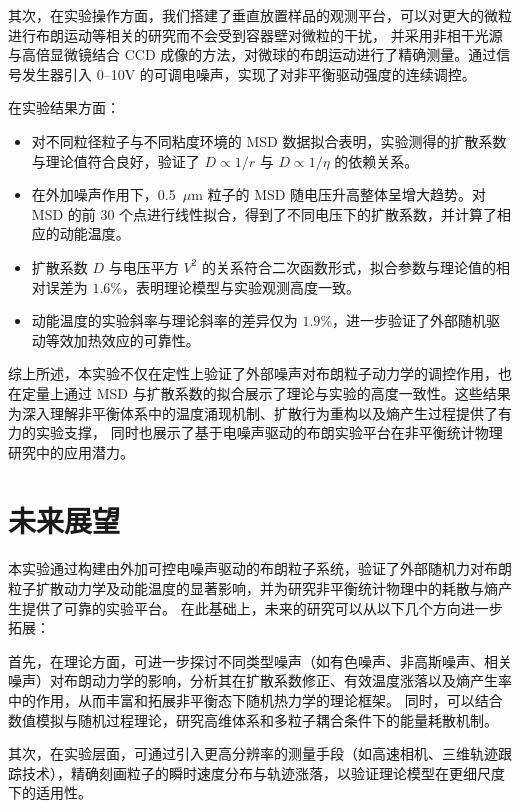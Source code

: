 \documentclass[a4paper]{report} %
\begin{document}
其次，在实验操作方面，我们搭建了垂直放置样品的观测平台，可以对更大的微粒进行布朗运动等相关的研究而不会受到容器壁对微粒的干扰，
并采用非相干光源与高倍显微镜结合 CCD 成像的方法，对微球的布朗运动进行了精确测量。通过信号发生器引入 0--10V 的可调电噪声，实现了对非平衡驱动强度的连续调控。\par

在实验结果方面：\par
\begin{itemize}
    \item 对不同粒径粒子与不同粘度环境的 MSD 数据拟合表明，实验测得的扩散系数与理论值符合良好，验证了 $D \propto 1/r$ 与 $D \propto 1/\eta$ 的依赖关系。
    \item 在外加噪声作用下，0.5~$\mu$m 粒子的 MSD 随电压升高整体呈增大趋势。对 MSD 的前 30 个点进行线性拟合，得到了不同电压下的扩散系数，并计算了相应的动能温度。
    \item 扩散系数 $D$ 与电压平方 $V^2$ 的关系符合二次函数形式，拟合参数与理论值的相对误差为 $1.6\%$，表明理论模型与实验观测高度一致。
    \item 动能温度的实验斜率与理论斜率的差异仅为 $1.9\%$，进一步验证了外部随机驱动等效加热效应的可靠性。
\end{itemize}

综上所述，本实验不仅在定性上验证了外部噪声对布朗粒子动力学的调控作用，也在定量上通过 MSD 与扩散系数的拟合展示了理论与实验的高度一致性。这些结果为深入理解非平衡体系中的温度涌现机制、扩散行为重构以及熵产生过程提供了有力的实验支撑，
同时也展示了基于电噪声驱动的布朗实验平台在非平衡统计物理研究中的应用潜力。

\section{未来展望}
本实验通过构建由外加可控电噪声驱动的布朗粒子系统，验证了外部随机力对布朗粒子扩散动力学及动能温度的显著影响，并为研究非平衡统计物理中的耗散与熵产生提供了可靠的实验平台。
在此基础上，未来的研究可以从以下几个方向进一步拓展：\par

首先，在理论方面，可进一步探讨不同类型噪声（如有色噪声、非高斯噪声、相关噪声）对布朗动力学的影响，分析其在扩散系数修正、有效温度涨落以及熵产生率中的作用，从而丰富和拓展非平衡态下随机热力学的理论框架。
同时，可以结合数值模拟与随机过程理论，研究高维体系和多粒子耦合条件下的能量耗散机制。\par

其次，在实验层面，可通过引入更高分辨率的测量手段（如高速相机、三维轨迹跟踪技术），精确刻画粒子的瞬时速度分布与轨迹涨落，以验证理论模型在更细尺度下的适用性。
\end{document}
